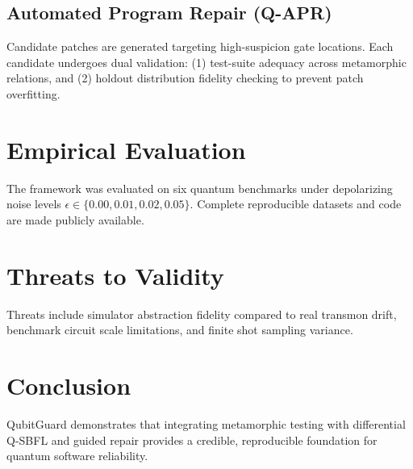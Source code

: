 \documentclass[10pt,journal,compsoc]{IEEEtran}
\begin{document}
\subsection{Automated Program Repair (Q-APR)}
Candidate patches are generated targeting high-suspicion gate locations. Each candidate undergoes dual validation: (1) test-suite adequacy across metamorphic relations, and (2) holdout distribution fidelity checking to prevent patch overfitting.

\section{Empirical Evaluation}
The framework was evaluated on six quantum benchmarks under depolarizing noise levels $\epsilon \in \{0.00, 0.01, 0.02, 0.05\}$. Complete reproducible datasets and code are made publicly available.

\section{Threats to Validity}
Threats include simulator abstraction fidelity compared to real transmon drift, benchmark circuit scale limitations, and finite shot sampling variance.

\section{Conclusion}
QubitGuard demonstrates that integrating metamorphic testing with differential Q-SBFL and guided repair provides a credible, reproducible foundation for quantum software reliability.



\end{document}
